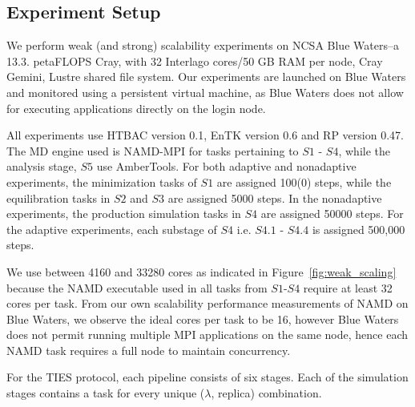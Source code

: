 
\subsection{Experiment Setup}\label{ssec:exp_design}

We perform weak (and strong) scalability experiments on NCSA Blue Waters--a
13.3. petaFLOPS Cray, with 32 Interlago cores/50 GB RAM per node, Cray Gemini,
Lustre shared file system. Our experiments are launched on Blue Waters and
monitored using a persistent virtual machine, as Blue Waters does not allow
for executing applications directly on the login node.


All experiments use HTBAC version 0.1, EnTK version 0.6 and RP version 0.47.
The MD engine used is NAMD-MPI for tasks pertaining to $S1$ - $S4$, while the
analysis stage, $S5$ use AmberTools. For both adaptive and nonadaptive
experiments, the minimization tasks of $S1$ are assigned 100(0) steps, while
the equilibration tasks in $S2$ and $S3$ are assigned 5000 steps. In the
nonadaptive experiments, the production simulation tasks in $S4$ are assigned
50000 steps. For the adaptive experiments, each substage of $S4$ i.e. $S4.1$ -
$S4.4$ is assigned 500,000 steps.


We use between 4160 and 33280 cores as indicated in
Figure~\ref{fig:weak_scaling} because the NAMD executable used in all tasks
from $S1$-$S4$ require at least 32 cores per task. From our own scalability
performance measurements of NAMD on Blue Waters, we observe the ideal cores
per task to be 16, however Blue Waters does not permit running multiple MPI
applications on the same node, hence each NAMD task requires a full node to
maintain concurrency.

For the TIES protocol, each pipeline consists of six stages. Each of the simulation
stages contains a task for every unique ($\lambda$, replica) combination.




